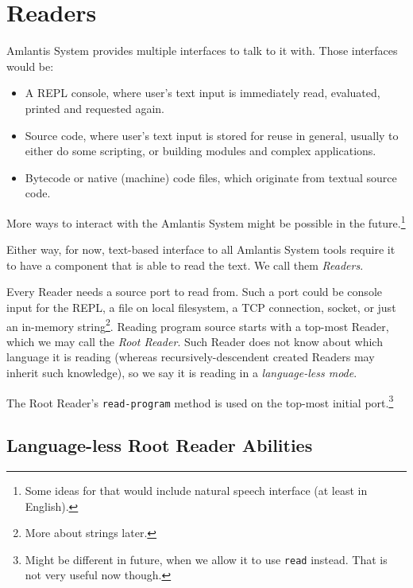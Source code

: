 
\chapter{Readers}
\label{sec:environment-readers}

Amlantis System provides multiple interfaces to talk to it with. Those interfaces would be:

\begin{itemize}
  \item A REPL console, where user's text input is immediately read, evaluated, printed and requested again.
  \item Source code, where user's text input is stored for reuse in general, usually to either do some scripting, or building modules and complex applications. 
  \item Bytecode or native (machine) code files, which originate from textual source code.
\end{itemize}

More ways to interact with the Amlantis System might be possible in the future.\footnote{Some ideas for that would include natural speech interface (at least in English).}

Either way, for now, text-based interface to all Amlantis System tools require it to have a component that is able to read the text. We call them {\em Readers}.

Every Reader needs a source port to read from. Such a port could be console input for the REPL, a file on local filesystem, a TCP connection, socket, or just an in-memory string\footnote{More about strings later.}. Reading program source starts with a top-most Reader, which we may call the {\em Root Reader}. Such Reader does not know about which language it is reading (whereas recursively-descendent created Readers may inherit such knowledge), so we say it is reading in a {\em language-less mode}.

The Root Reader's \lstinline!read-program! method is used on the top-most initial port.\footnote{Might be different in future, when we allow it to use \lstinline!read! instead. That is not very useful now though.}




\newpage

\section{Language-less Root Reader Abilities}

